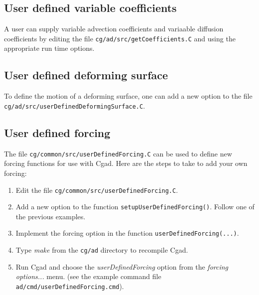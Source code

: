 \documentclass[11pt]{article}
\begin{document}
\clearpage
\subsection{User defined variable coefficients} \label{sec:userDefinedVariableCoefficients}

A user can supply variable advection coefficients and variaable diffusion coefficients
by editing the file {\tt cg/ad/src/getCoefficients.C} and using the appropriate
run time options. 


\subsection{User defined deforming surface} \label{sec:userDefinedDeformingSurface}

To define the motion of a deforming surface, one can add a new option to the
file {\tt cg/ad/src/userDefinedDeformingSurface.C}. 



\subsection{User defined forcing} \label{sec:userDefinedForcing}


The file {\tt cg/common/src/userDefinedForcing.C} can be used to define new forcing functions
for use with Cgad. Here are the steps to take to add your own forcing:
\begin{enumerate}
  \item Edit the file  {\tt cg/common/src/userDefinedForcing.C}.
  \item Add a new option to the function {\tt setupUserDefinedForcing()}. Follow one of the previous
         examples. 
  \item Implement the forcing option in the function {\tt userDefinedForcing(...)}.
  \item Type {\em make} from the {\tt cg/ad} directory to recompile Cgad.
  \item Run Cgad and choose the {\em userDefinedForcing} option from the {\em forcing options...} menu.
    (see the example command file {\tt ad/cmd/userDefinedForcing.cmd}).
\end{enumerate}
\end{document}

